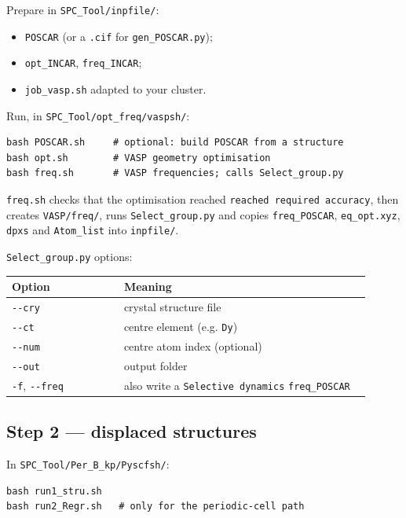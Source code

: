 \documentclass[11pt,a4paper]{article}
\providecommand{\tightlist}{%
  \setlength{\itemsep}{0pt}\setlength{\parskip}{0pt}}
\begin{document}
Prepare in \texttt{SPC\_Tool/inpfile/}:

\begin{itemize}
\tightlist
\item
  \texttt{POSCAR} (or a \texttt{.cif} for \texttt{gen\_POSCAR.py});
\item
  \texttt{opt\_INCAR}, \texttt{freq\_INCAR};
\item
  \texttt{job\_vasp.sh} adapted to your cluster.
\end{itemize}

Run, in \texttt{SPC\_Tool/opt\_freq/vaspsh/}:

\begin{lstlisting}
bash POSCAR.sh     # optional: build POSCAR from a structure
bash opt.sh        # VASP geometry optimisation
bash freq.sh       # VASP frequencies; calls Select_group.py
\end{lstlisting}

\texttt{freq.sh} checks that the optimisation reached
\texttt{reached\ required\ accuracy}, then creates \texttt{VASP/freq/},
runs \texttt{Select\_group.py} and copies \texttt{freq\_POSCAR},
\texttt{eq\_opt.xyz}, \texttt{dpxs} and \texttt{Atom\_list} into
\texttt{inpfile/}.

\texttt{Select\_group.py} options:

\begin{longtable}[]{@{}>{\raggedright\arraybackslash}p{0.30\linewidth} >{\raggedright\arraybackslash}p{0.66\linewidth}@{}}
\toprule
Option & Meaning\tabularnewline
\midrule
\endhead
\texttt{-\/-cry} & crystal structure file\tabularnewline
\texttt{-\/-ct} & centre element (e.g. \texttt{Dy})\tabularnewline
\texttt{-\/-num} & centre atom index (optional)\tabularnewline
\texttt{-\/-out} & output folder\tabularnewline
\texttt{-f}, \texttt{-\/-freq} & also write a
\texttt{Selective\ dynamics} \texttt{freq\_POSCAR}\tabularnewline
\bottomrule
\end{longtable}

\subsection{Step 2 --- displaced
structures}\label{step-2-displaced-structures}

In \texttt{SPC\_Tool/Per\_B\_kp/Pyscfsh/}:

\begin{lstlisting}
bash run1_stru.sh
bash run2_Regr.sh   # only for the periodic-cell path
\end{lstlisting}
\end{document}
